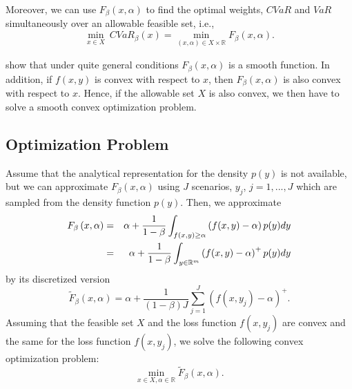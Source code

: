 \documentclass[a4paper,10pt]{article}
\begin{document}
Moreover, we can use $F_{\beta }\left( x,\alpha \right) $ to find the optimal weights, $CVaR$ and
$VaR$ simultaneously over an allowable feasible set, i.e.,
\begin{equation}
\underset{x\in X}{\min }~CVaR_{\beta }(x)=\underset{}{\underset{\left(
		x,\alpha \right) \in X\times
		\mathbb{R}
	}{\min }F_{\beta }\left( x,\alpha \right) }.  \label{eight}
\end{equation}

\citet*{pflug2000} show that under quite general conditions $F_{\beta
}\left( x,\alpha \right) $ is a smooth function. In addition, if $f(x,y)$ is
convex with respect to $x$, then $F_{\beta }\left( x,\alpha \right) $ is
also convex with respect to $x$. Hence, if the allowable set $X$ is also
convex, we then have to solve a smooth convex optimization problem.

\subsection{Optimization Problem}

Assume that the analytical representation for the density $p(y)$ is not
available, but we can approximate $F_{\beta }\left( x,\alpha \right) $ using
$J$ scenarios, $y_{j}$, $j=1,...,J$ which are sampled from the density
function $p(y)$. Then, we approximate
\begin{eqnarray}
F_{\beta }\left( x,\alpha \right) &=&\alpha +\frac{1}{1-\beta }%
\int_{f(x,y)\geq \alpha }\left( f(x,y)-\alpha \right) p(y)dy  \notag \\
&=&\alpha +\frac{1}{1-\beta }\int_{y\in
	\mathbb{R}
	^{m}}\left( f(x,y)-\alpha \right) ^{+}p(y)dy  \label{fb}
\end{eqnarray}%
by its discretized version
\begin{equation*}
\widetilde{F}_{\beta }\left( x,\alpha \right) =\alpha +\frac{1}{\left(
	1-\beta \right) J}\sum_{j=1}^{J}\left( f(x,y_{j})-\alpha \right) ^{+}.
\end{equation*}%
Assuming that the feasible set $X$ and the loss
function $f(x,y_{j})$ are convex and the same for the loss
function $f(x,y_{j})$, we solve the following convex optimization problem:
\begin{equation}
\underset{x\in X,\alpha \in
	\mathbb{R}
}{\min }\widetilde{F}_{\beta }\left( x,\alpha \right) .  \label{ten}
\end{equation}
\end{document}

